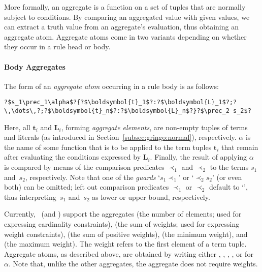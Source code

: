 More formally,
an aggregate is a function on a set of tuples that are normally subject to conditions.
By comparing an aggregated value with given values, we can extract a truth value from an aggregate's evaluation,
thus
obtaining an aggregate atom.
Aggregate atoms come in two variants depending on whether they occur in a rule head or body.

\paragraph{Body Aggregates}
The form of an \emph{aggregate atom} occurring in a rule body is as follows:
%
\begin{lstlisting}[numbers=none,escapechar=?]
?$s_1\prec_1\alpha$?{?$\boldsymbol{t}_1$?:?$\boldsymbol{L}_1$?;?\,\dots\,?;?$\boldsymbol{t}_n$?:?$\boldsymbol{L}_n$?}?$\prec_2 s_2$?
\end{lstlisting}
%
Here, all $\boldsymbol{t}_i$ and $\boldsymbol{L}_i$, forming \emph{aggregate elements}, are non-empty tuples of terms and literals
(as introduced in Section~\ref{subsec:gringo:normal}), respectively.
$\alpha$ is the name of some function that is to be applied to the term tuples $\boldsymbol{t}_i$
that remain after evaluating the conditions expressed by $\boldsymbol{L}_i$.
%
Finally,
the result of applying $\alpha$ is compared by means of the comparison predicates $\prec_1$ and $\prec_2$
to the terms $s_1$ and~$s_2$, respectively.
Note that one of the \emph{guards} `$s_1\prec_1$' or `$\prec_2 s_2$'
(or even both) can be omitted;
left out comparison predicates $\prec_1$ or $\prec_2$ default to `\code{<=}',
thus interpreting~$s_1$ and~$s_2$ as lower or upper bound, respectively.

Currently, \gringo\ (and \clingo) support the aggregates
%
(the number of elements; used for expressing cardinality constraints),
%
(the sum of weights; used for expressing weight constraints),
%
(the sum of positive weights),
%
(the minimum weight), and
%
(the maximum weight).
The weight refers to the first element of a term tuple.
Aggregate atoms, as described above, are obtained by writing
either , , , , or  for~$\alpha$.
%
Note that, unlike the other aggregates, the  aggregate does not require weights.

